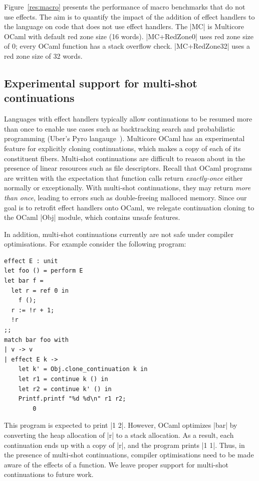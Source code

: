 \documentclass[sigplan,10pt,review,anonymous]{acmart}\settopmatter{printfolios=true,printccs=false,printacmref=false}
\begin{document}
Figure~\ref{res:macro} presents the performance of macro benchmarks that do not
use effects. The aim is to quantify the impact of the addition of effect
handlers to the language on code that does not use effect handlers. The |MC| is
Multicore OCaml with default red zone size (16 words). |MC+RedZone0| uses red
zone size of 0; every OCaml function has a stack overflow check. |MC+RedZone32|
uses a red zone size of 32 words.

\subsection*{Experimental support for multi-shot continuations}

Languages with effect handlers typically allow continuations to be resumed more
than once to enable use cases such as backtracking search and probabilistic
programming (Uber's Pyro langauge~\cite{Pyro}). Multicore OCaml has an
experimental feature for explicitly cloning continuations, which makes a copy
of each of its constituent fibers. Multi-shot continuations are difficult to
reason about in the presence of linear resources such as file descriptors.
Recall that OCaml programs are written with the expectation that function calls
return \emph{exactly-once} either normally or exceptionally. With multi-shot
continuations, they may return \emph{more than once}, leading to errors such as
double-freeing malloced memory. Since our goal is to retrofit effect handlers
onto OCaml, we relegate continuation cloning to the OCaml |Obj| module, which
contains unsafe features.

In addition, multi-shot continuations currently are not safe under compiler
optimisations. For example consider the following program:

\begin{minipage}{\linewidth}
\begin{lstlisting}
effect E : unit
let foo () = perform E
let bar f =
  let r = ref 0 in
	f ();
  r := !r + 1;
  !r
;;
match bar foo with
| v -> v
| effect E k ->
    let k' = Obj.clone_continuation k in
    let r1 = continue k () in
    let r2 = continue k' () in
    Printf.printf "%d %d\n" r1 r2;
		0
\end{lstlisting}
\end{minipage}

This program is expected to print |1 2|. However, OCaml optimizes |bar| by
converting the heap allocation of |r| to a stack allocation. As a result, each
continuation ends up with a copy of |r|, and the program prints |1 1|. Thus, in
the presence of multi-shot continuations, compiler optimisations need to be
made aware of the effects of a function. We leave proper support for multi-shot
continuations to future work.
\end{document}
